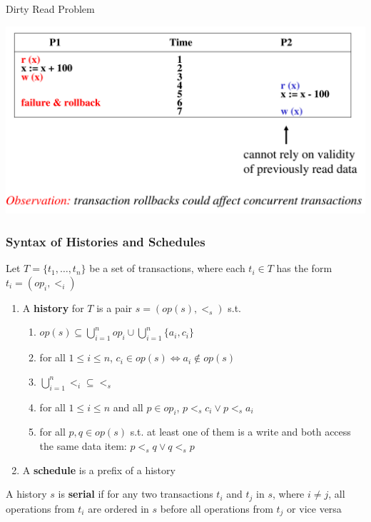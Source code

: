 \documentclass[11pt]{article}
\begin{document}
Dirty Read Problem
\begin{center}
\includegraphics[width=.8\textwidth]{../images/bigdatabase/4.png}
\label{}
\end{center}
\subsubsection{Syntax of Histories and Schedules}
\label{sec:org5f2fa37}
\begin{definition}
Let \(T=\{t_1,\dots,t_n\}\) be a set of transactions, where each \(t_i\in T\) has the form
\(t_i=(op_i,<_i)\)
\begin{enumerate}
\item A \textbf{history} for \(T\) is a pair \(s=(op(s),<_s)\) s.t.
\begin{enumerate}
\item \(op(s)\subseteq\bigcup_{i=1}^nop_i\cup\bigcup_{i=1}^n\{a_i,c_i\}\)
\item for all \(1\le i\le n\), \(c_i\in op(s)\Leftrightarrow a_i\notin op(s)\)
\item \(\bigcup_{i=1}^n<_i\subseteq<_s\)
\item for all \(1\le i\le n\) and all \(p\in op_i\), \(p<_sc_i\vee p<_sa_i\)
\item for all \(p,q\in op(s)\) s.t. at least one of them is a write and both access the same
data item: \(p<_sq\vee q<_sp\)
\end{enumerate}
\item A \textbf{schedule} is a prefix of a history
\end{enumerate}
\end{definition}

\begin{definition}[]
A history \(s\) is \textbf{serial} if for any two transactions \(t_i\) and \(t_j\) in \(s\),
where \(i\neq j\), all operations from \(t_i\) are ordered in \(s\) before all operations
from \(t_j\) or vice versa
\end{definition}
\end{document}
